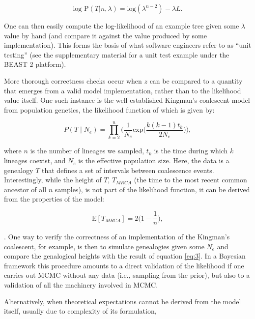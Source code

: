 \documentclass[oneside]{article}
\begin{document}
\begin{equation}
\text{log P}(T|n,\lambda) = \text{log}(\lambda^{n-2}) - \lambda L.
\end{equation}

\noindent One can then easily compute the log-likelihood of an example
tree given some $\lambda$ value by hand (and
compare it against the value produced by some implementation).
This forms the basis of what software engineers refer to as ``unit
testing'' (see the supplementary material for a unit test example
under the BEAST 2 platform).

More thorough correctness checks occur when $z$ can be
compared to a quantity that emerges from a valid model implementation,
rather than to the likelihood value itself.
One such instance is the well-established Kingman's coalescent model \citep{kingman82}
from population genetics, the likelihood function of which is given by:

\begin{equation}
  P(T \mid N_e) = \prod_{k=2}^{n} \Bigg( \frac{1}{N_e} \text{exp} \Bigg(
  \frac{k(k-1)t_k}{2N_e} \Bigg) \Bigg),
  \label{eq:2}
\end{equation}

\noindent where $n$ is the number of lineages we sampled, $t_k$ is the time during which $k$ lineages
coexist, and $N_e$ is the effective population size.
Here, the data is a genealogy $T$ that defines a set of intervals
between coalescence events.
Interestingly, while the height of $T$, $T_{MRCA}$ (the time to the most
recent common ancestor of all $n$ samples), is not part of the
likelihood function, it can be derived from the properties of the
model:

\begin{equation}
  \text{E}[T_{MRCA}] = 2 \bigg(1-\frac{1}{n}\bigg),
  \label{eq:3}
\end{equation}

\noindent \citep{hudson90}.
One way to verify the correctness of an implementation of the Kingman's
coalescent, for example, is then to simulate genealogies given some
$N_e$ and compare the genalogical heights with the result of equation
\ref{eq:3}.
In a Bayesian framework this procedure amounts to a direct validation of the
likelihood if one carries out MCMC without any data (i.e., sampling
from the prior), but also to a validation of all the machinery involved in MCMC.

Alternatively, when theoretical expectations cannot be derived from
the model itself, usually due to complexity of its formulation, {\color{red}{[Place holder for Christiaan's text]}}
\end{document}
